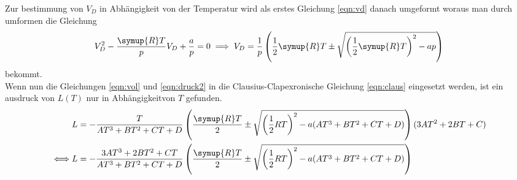 Zur bestimmung von $V_D$ in Abhängigkeit von der Temperatur wird als erstes Gleichung \ref{eqn:vd} danach umgeformt
woraus man durch umformen die Gleichung 
\begin{equation}
    V_{D}^2-\frac{\symup{R}T}{p}V_D+\frac{a}{p}=0 \implies 
    V_D=\frac{1}{p}\left(\frac{1}{2}\symup{R}T\pm\sqrt{\left(\frac{1}{2}\symup{R}T\right)^2-ap}\right)
    \label{eqn:vol}
\end{equation}
bekommt.\\
Wenn nun die Gleichungen \ref{eqn:vol} und \ref{eqn:druck2} in die Clausius-Clapexronische Gleichung \ref{eqn:claus} eingesetzt
werden, ist ein ausdruck von $L(T)$ nur in Abhängigkeitvon $T$ gefunden.
\begin{align}
    &L=-\frac{T}{AT^3+BT^2+CT+D}\left(\frac{\symup{R}T}{2}\pm\sqrt{\left(\frac{1}{2}RT\right)^2-a(AT^3+BT^2+CT+D)}\right)(3AT^2+2BT+C)\\
    \iff &L=-\frac{3AT^3+2BT^2+CT}{AT^3+BT^2+CT+D}\left(\frac{\symup{R}T}{2}\pm\sqrt{\left(\frac{1}{2}RT\right)^2-a(AT^3+BT^2+CT+D)}\right)
    \label{eqn:L}
\end{align}

